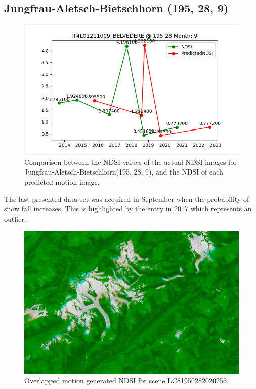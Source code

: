 \documentclass[12pt, a4paper]{report}
\begin{document}
	
	\newpage{}
	
	\subsection{Jungfrau-Aletsch-Bietschhorn (195, 28, 9)}
	
	\begin{figure}[h!]
		\centering
		\includegraphics[width=\linewidth]{../images/experiment_195289.png}
		\caption{Comparison between the NDSI values of the actual NDSI images for Jungfrau-Aletsch-Bietschhorn(195, 28, 9), and the NDSI of each predicted motion image.}
		\label{fig:jungfrau_195289}
	\end{figure}

	The last presented data set was acquired in September when the probability of snow fall increases. This is highlighted by the entry in 2017 which represents an outlier.

	\begin{figure}[h!]
	\centering
	\includegraphics[width=\linewidth]{../images/experiment_1950289.png}
	\caption{Overlapped motion generated NDSI for scene LC81950282020256.}
	\label{fig:experiment_1950289_image}
	\end{figure}
	
\end{document}
